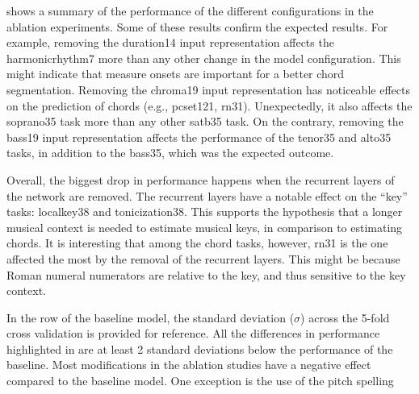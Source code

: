 

 shows a summary of the performance of the
different configurations in the ablation experiments. Some
of these results confirm the expected results. For example,
removing the \gls{duration14} input representation affects
the \gls{harmonicrhythm7} more than any other change in the
model configuration. This might indicate that measure onsets
are important for a better chord segmentation. Removing the
\gls{chroma19} input representation has noticeable effects
on the prediction of chords (e.g., \gls{pcset121},
\gls{rn31}). Unexpectedly, it also affects the
\gls{soprano35} task more than any other \gls{satb35} task.
On the contrary, removing the \gls{bass19} input
representation affects the performance of the \gls{tenor35}
and \gls{alto35} tasks, in addition to the \gls{bass35},
which was the expected outcome.

Overall, the biggest drop in performance happens when the
recurrent layers of the network are removed. The recurrent
layers have a notable effect on the ``key'' tasks:
\gls{localkey38} and \gls{tonicization38}. This supports the
hypothesis that a longer musical context is needed to
estimate musical keys, in comparison to estimating chords.
It is interesting that among the chord tasks, however,
\gls{rn31} is the one affected the most by the removal of
the recurrent layers. This might be because Roman numeral
numerators are relative to the key, and thus sensitive to
the key context.

In the row of the baseline model, the standard deviation
($\sigma$) across the 5-fold cross validation is provided
for reference. All the differences in performance
highlighted in  are at least 2 standard
deviations below the performance of the baseline. 
Most modifications in the ablation studies have a negative
effect compared to the baseline model. One exception is the
use of the pitch spelling
